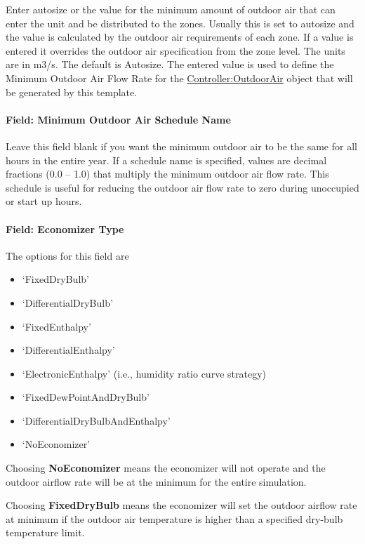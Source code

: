 Enter autosize or the value for the minimum amount of outdoor air that can enter the unit and be distributed to the zones. Usually this is set to autosize and the value is calculated by the outdoor air requirements of each zone. If a value is entered it overrides the outdoor air specification from the zone level. The units are in m3/s. The default is Autosize. The entered value is used to define the Minimum Outdoor Air Flow Rate for the \hyperref[controlleroutdoorair]{Controller:OutdoorAir} object that will be generated by this template.

\paragraph{Field: Minimum Outdoor Air Schedule Name}\label{field-minimum-outdoor-air-schedule-name-000}

Leave this field blank if you want the minimum outdoor air to be the same for all hours in the entire year. If a schedule name is specified, values are decimal fractions (0.0 -- 1.0) that multiply the minimum outdoor air flow rate. This schedule is useful for reducing the outdoor air flow rate to zero during unoccupied or start up hours.

\paragraph{Field: Economizer Type}\label{field-economizer-type}

The options for this field are

\begin{itemize}
\item
  `FixedDryBulb'
\item
  `DifferentialDryBulb'
\item
  `FixedEnthalpy'
\item
  `DifferentialEnthalpy'
\item
  `ElectronicEnthalpy' (i.e., humidity ratio curve strategy)
\item
  `FixedDewPointAndDryBulb'
\item
  `DifferentialDryBulbAndEnthalpy'
\item
  `NoEconomizer'
\end{itemize}

Choosing \textbf{NoEconomizer} means the economizer will not operate and the outdoor airflow rate will be at the minimum for the entire simulation.

Choosing \textbf{FixedDryBulb} means the economizer will set the outdoor airflow rate at minimum if the outdoor air temperature is higher than a specified dry-bulb temperature limit.

